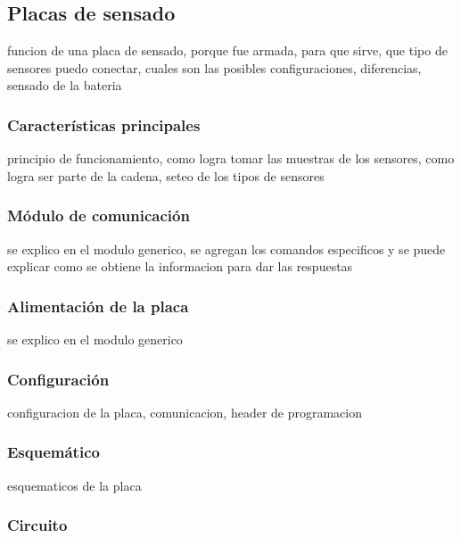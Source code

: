 \subsection{Placas de sensado}
\label{h_placas_sensado}

funcion de una placa de sensado, porque fue armada, para que sirve, que tipo de sensores puedo conectar, cuales son las posibles configuraciones, diferencias, sensado de la bateria

\subsubsection{Caracter\'isticas principales}
\label{h_placas_sensado_caracteristicas}

principio de funcionamiento, como logra tomar las muestras de los sensores, como logra ser parte de la cadena, seteo de los tipos de sensores

\subsubsection{M\'odulo de comunicaci\'on}
\label{h_placas_sensado_comm}

se explico en el modulo generico, se agregan los comandos especificos y se puede explicar como se obtiene la informacion para dar las respuestas

\subsubsection{Alimentaci\'on de la placa}
\label{h_placas_sensado_alimentacion}

se explico en el modulo generico

\subsubsection{Configuraci\'on}
\label{h_placas_sensado_config}

configuracion de la placa, comunicacion, header de programacion

\subsubsection{Esquem\'atico}
\label{h_placas_sensado_esquematico}

esquematicos de la placa

\subsubsection{Circuito}
\label{h_placas_sensado_circuito}


